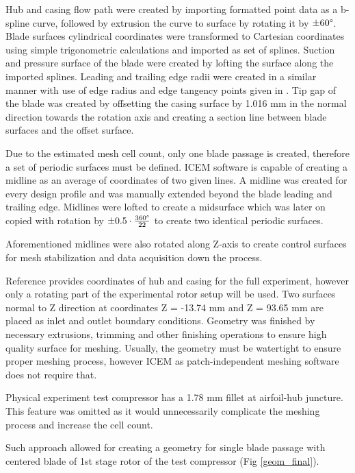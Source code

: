 Hub and casing flow path were created by importing formatted point data as a b-spline curve, followed by extrusion the curve to surface by rotating it by $\pm 60 \degree$. Blade surfaces cylindrical coordinates were transformed to Cartesian coordinates using simple trigonometric calculations and imported as set of splines. Suction and pressure surface of the blade were created by lofting the surface along the imported splines. Leading and trailing edge radii were created in a similar manner with use of edge radius and edge tangency points given in \citep{r67laser}. Tip gap of the blade was created by offsetting the casing surface by 1.016 mm in the normal direction towards the rotation axis and creating a section line between blade surfaces and the offset surface.

Due to the estimated mesh cell count, only one blade passage is created, therefore a set of periodic surfaces must be defined. ICEM software is capable of creating a midline as an average of coordinates of two given lines. A midline was created for every design profile and was manually extended beyond the blade leading and trailing edge. Midlines were lofted to create a midsurface which was later on copied with rotation by $\pm 0.5 \cdot \frac{360 \degree}{22}$ to create two identical periodic surfaces.

Aforementioned midlines were also rotated along Z-axis to create control surfaces for mesh stabilization and data acquisition down the process.

Reference \citep{r67laser} provides coordinates of hub and casing for the full experiment, however only a rotating part of the experimental rotor setup will be used. Two surfaces normal to Z direction at coordinates Z = -13.74 mm and Z = 93.65 mm are placed as inlet and outlet boundary conditions. Geometry was finished by necessary extrusions, trimming and other finishing operations to ensure high quality surface for meshing. Usually, the geometry must be watertight  to ensure proper meshing process, however ICEM as patch-independent meshing software does not require that.

Physical experiment test compressor has a 1.78 mm fillet at airfoil-hub juncture. This feature was omitted as it would unnecessarily complicate the meshing process and increase the cell count.

Such approach allowed for creating a geometry for single blade passage with centered blade of 1st stage rotor of the test compressor (Fig \ref{geom_final}).


